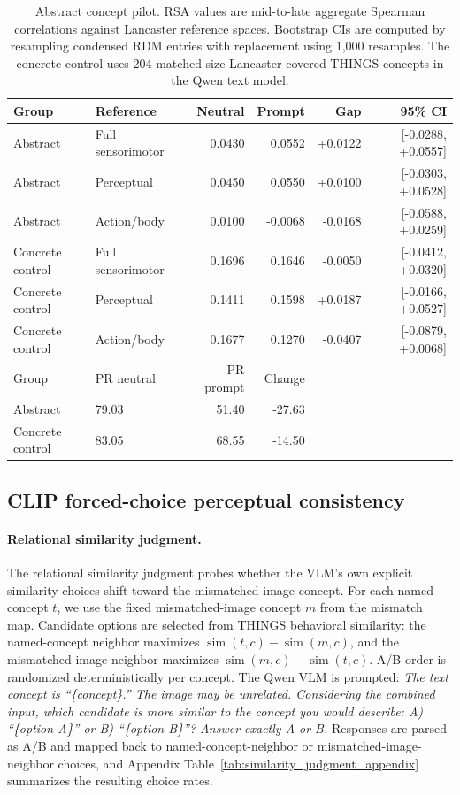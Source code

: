 \documentclass{article}
\begin{document}
\begin{table}[!htbp]
\centering
\caption{Abstract concept pilot. RSA values are mid-to-late aggregate Spearman correlations against Lancaster reference spaces. Bootstrap CIs are computed by resampling condensed RDM entries with replacement using 1,000 resamples. The concrete control uses 204 matched-size Lancaster-covered THINGS concepts in the Qwen text model.}
\label{tab:abstract_pilot}
\small
\begin{tabular}{llrrrr}
\toprule
Group & Reference & Neutral & Prompt & Gap & 95\% CI \\
\midrule
Abstract & Full sensorimotor & 0.0430 & 0.0552 & +0.0122 & [-0.0288, +0.0557] \\
Abstract & Perceptual & 0.0450 & 0.0550 & +0.0100 & [-0.0303, +0.0528] \\
Abstract & Action/body & 0.0100 & -0.0068 & -0.0168 & [-0.0588, +0.0259] \\
Concrete control & Full sensorimotor & 0.1696 & 0.1646 & -0.0050 & [-0.0412, +0.0320] \\
Concrete control & Perceptual & 0.1411 & 0.1598 & +0.0187 & [-0.0166, +0.0527] \\
Concrete control & Action/body & 0.1677 & 0.1270 & -0.0407 & [-0.0879, +0.0068] \\
\midrule
Group & PR neutral & PR prompt & Change & \multicolumn{2}{c}{} \\
\midrule
Abstract & 79.03 & 51.40 & -27.63 & \multicolumn{2}{c}{} \\
Concrete control & 83.05 & 68.55 & -14.50 & \multicolumn{2}{c}{} \\
\bottomrule
\end{tabular}
\end{table}

\subsection{CLIP forced-choice perceptual consistency}
\label{app:clip_forced_choice}

\paragraph{Relational similarity judgment.}
The relational similarity judgment probes whether the VLM's own explicit similarity choices shift toward the mismatched-image concept. For each named concept \(t\), we use the fixed mismatched-image concept \(m\) from the mismatch map. Candidate options are selected from THINGS behavioral similarity: the named-concept neighbor maximizes \(\operatorname{sim}(t,c)-\operatorname{sim}(m,c)\), and the mismatched-image neighbor maximizes \(\operatorname{sim}(m,c)-\operatorname{sim}(t,c)\). A/B order is randomized deterministically per concept. The Qwen VLM is prompted: \textit{The text concept is ``\{concept\}.'' The image may be unrelated. Considering the combined input, which candidate is more similar to the concept you would describe: A) ``\{option A\}'' or B) ``\{option B\}''? Answer exactly A or B.} Responses are parsed as A/B and mapped back to named-concept-neighbor or mismatched-image-neighbor choices, and Appendix Table~\ref{tab:similarity_judgment_appendix} summarizes the resulting choice rates.
\end{document}
